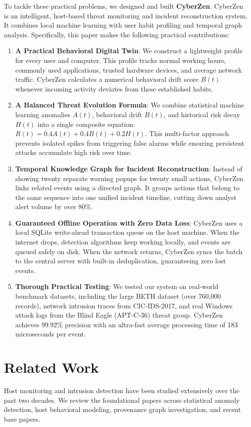 \documentclass[conference]{IEEEtran}
\begin{document}
To tackle these practical problems, we designed and built \textbf{CyberZen}. CyberZen is an intelligent, host-based threat monitoring and incident reconstruction system. It combines local machine learning with user habit profiling and temporal graph analysis. Specifically, this paper makes the following practical contributions:
\begin{enumerate}
    \item \textbf{A Practical Behavioral Digital Twin}: We construct a lightweight profile for every user and computer. This profile tracks normal working hours, commonly used applications, trusted hardware devices, and average network traffic. CyberZen calculates a numerical behavioral drift score $B(t)$ whenever incoming activity deviates from these established habits.
    \item \textbf{A Balanced Threat Evolution Formula}: We combine statistical machine learning anomalies $A(t)$, behavioral drift $B(t)$, and historical risk decay $H(t)$ into a single composite equation: $R(t) = 0.4 A(t) + 0.4 B(t) + 0.2 H(t)$. This multi-factor approach prevents isolated spikes from triggering false alarms while ensuring persistent attacks accumulate high risk over time.
    \item \textbf{Temporal Knowledge Graph for Incident Reconstruction}: Instead of showing twenty separate warning popups for twenty small actions, CyberZen links related events using a directed graph. It groups actions that belong to the same sequence into one unified incident timeline, cutting down analyst alert volume by over 80\%.
    \item \textbf{Guaranteed Offline Operation with Zero Data Loss}: CyberZen uses a local SQLite write-ahead transaction queue on the host machine. When the internet drops, detection algorithms keep working locally, and events are queued safely on disk. When the network returns, CyberZen syncs the batch to the central server with built-in deduplication, guaranteeing zero lost events.
    \item \textbf{Thorough Practical Testing}: We tested our system on real-world benchmark datasets, including the large BETH dataset (over 760,000 records), network intrusion traces from CIC-IDS-2017, and real Windows attack logs from the Blind Eagle (APT-C-36) threat group. CyberZen achieves 99.92\% precision with an ultra-fast average processing time of 183 microseconds per event.
\end{enumerate}

\section{Related Work}
Host monitoring and intrusion detection have been studied extensively over the past two decades. We review the foundational papers across statistical anomaly detection, host behavioral modeling, provenance graph investigation, and recent base papers.
\end{document}
